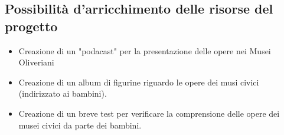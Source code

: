 \documentclass[hidelinks,12pt,a4paper]{article}
\begin{document}
\begin{flushleft}
		\section{Possibilità d'arricchimento delle risorse del progetto}
		
		\begin{itemize}
			\item Creazione di un "podacast" per la presentazione delle opere nei Musei Oliveriani
			\item Creazione di un album di figurine riguardo le opere dei musi civici (indirizzato ai bambini).
			\item Creazione di un breve test per verificare la comprensione delle opere dei musei civici da parte dei bambini.  
		\end{itemize}
	
		\vspace*{\fill}
		\doclicenseThis
				
	\end{flushleft}
\end{document}
